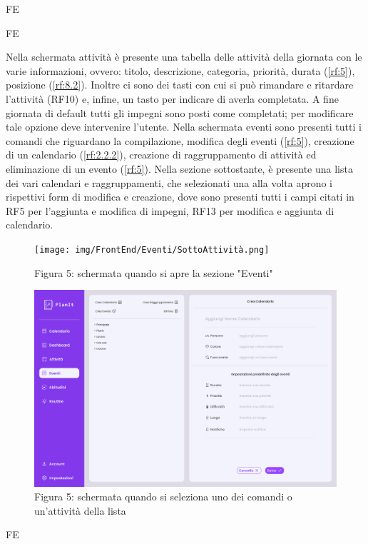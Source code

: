 \begin{listaPersonale}{FE}
\begin{listaPersonale2}{FE}
    \end{listaPersonale2}
    \pagebreak
     Nella schermata attività è presente una tabella delle attività della giornata con le varie informazioni, ovvero: titolo, descrizione, categoria, priorità, durata (\ref{rf:5}), posizione (\ref{rf:8.2}). Inoltre ci sono dei tasti con cui si può rimandare e ritardare l’attività (RF10) e, infine, un tasto per indicare di averla completata. A fine giornata di default tutti gli impegni sono posti come completati; per modificare tale opzione deve intervenire l’utente.
    \pagebreak
     Nella schermata eventi sono presenti tutti i comandi che riguardano la compilazione, modifica degli eventi (\ref{rf:5}), creazione di un calendario (\ref{rf:2.2.2}), creazione di raggruppamento di attività ed eliminazione di un evento (\ref{rf:5}).
    Nella sezione sottostante, è presente una lista dei vari calendari e raggruppamenti, che selezionati una alla volta aprono i rispettivi form di modifica e creazione, dove sono presenti tutti i campi citati in RF5 per l’aggiunta e modifica di impegni, RF13 per modifica e aggiunta di calendario. 
    \begin{figure}[H]
        \centering
        \texttt{[image: img/FrontEnd/Eventi/SottoAttività.png]}
        \caption{Figura 5: schermata quando si apre la sezione "Eventi"}
    \end{figure}
    \begin{figure}[H]
        \centering
        \includegraphics[width=1\textwidth]{img/FrontEnd/Eventi/Calendario/CreaCalendario.png}
        \caption{Figura 5: schermata quando si seleziona uno dei comandi o un'attività della lista}
    \end{figure}
    \begin{listaPersonale2}{FE}
        

\end{listaPersonale2}
\end{listaPersonale}
